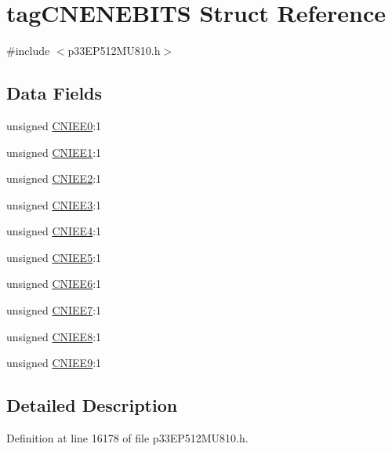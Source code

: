 \hypertarget{structtag_c_n_e_n_e_b_i_t_s}{}\section{tag\+C\+N\+E\+N\+E\+B\+I\+TS Struct Reference}
\label{structtag_c_n_e_n_e_b_i_t_s}


{\ttfamily \#include $<$p33\+E\+P512\+M\+U810.\+h$>$}

\subsection*{Data Fields}
\begin{DoxyCompactItemize}
\item 
unsigned \hyperlink{structtag_c_n_e_n_e_b_i_t_s_a7de6167153a78c36dee9faccac717e1f}{C\+N\+I\+E\+E0}\+:1
\item 
unsigned \hyperlink{structtag_c_n_e_n_e_b_i_t_s_ac2da76c2894b6781ee013aa04edd9be7}{C\+N\+I\+E\+E1}\+:1
\item 
unsigned \hyperlink{structtag_c_n_e_n_e_b_i_t_s_a62f1b846ef64f801b31c2a84fc14d6d9}{C\+N\+I\+E\+E2}\+:1
\item 
unsigned \hyperlink{structtag_c_n_e_n_e_b_i_t_s_a7c92eb2a78291aa5addee719f4c903a6}{C\+N\+I\+E\+E3}\+:1
\item 
unsigned \hyperlink{structtag_c_n_e_n_e_b_i_t_s_ab753358a6549c9eea661a021cf3e24fc}{C\+N\+I\+E\+E4}\+:1
\item 
unsigned \hyperlink{structtag_c_n_e_n_e_b_i_t_s_aa4a0508d8f5a354a7b02b7cb468e40a0}{C\+N\+I\+E\+E5}\+:1
\item 
unsigned \hyperlink{structtag_c_n_e_n_e_b_i_t_s_a034913bb789294d18724353e22e3c7f4}{C\+N\+I\+E\+E6}\+:1
\item 
unsigned \hyperlink{structtag_c_n_e_n_e_b_i_t_s_a8ebd9611b7c129ed6a1ac88999b6dc7b}{C\+N\+I\+E\+E7}\+:1
\item 
unsigned \hyperlink{structtag_c_n_e_n_e_b_i_t_s_ac198df4151894d8c55d6587da47da374}{C\+N\+I\+E\+E8}\+:1
\item 
unsigned \hyperlink{structtag_c_n_e_n_e_b_i_t_s_a9cc9f4b97de000524ec76dbc7fbf3619}{C\+N\+I\+E\+E9}\+:1
\end{DoxyCompactItemize}


\subsection{Detailed Description}


Definition at line 16178 of file p33\+E\+P512\+M\+U810.\+h.



